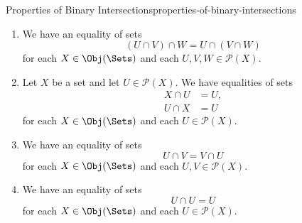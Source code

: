 \begin{proposition}{Properties of Binary Intersections}{properties-of-binary-intersections}
\begin{enumerate}
\begin{enumerate}
                    \begin{enumerate}
                        \item We have $U\cap V\subset W$.
                        \item We have $U\subset\eHom_{\mathcal{P}(X)}(V,W)$.
                        \item We have $U\subset(X\setminus V)\cup W$.
                    \end{enumerate}
                \item The following conditions are equivalent:
                    \begin{enumerate}
                        \item We have $V\cap U\subset W$.
                        \item We have $V\subset\eHom_{\mathcal{P}(X)}(U,W)$.
                        \item We have $V\subset(X\setminus U)\cup W$.
                    \end{enumerate}
            \end{enumerate}
        \item\label{properties-of-binary-intersections-associativity}We have an equality of sets
            \[
                (U\cap V)\cap W%
                =%
                U\cap(V\cap W)%
            \]%
            for each $X\in\Obj(\Sets)$ and each $U,V,W\in\mathcal{P}(X)$.
        \item\label{properties-of-binary-intersections-unitality}Let $X$ be a set and let $U\in\mathcal{P}(X)$. We have equalities of sets
            \begin{align*}
                X\cap U &= U,\\
                U\cap X &= U
            \end{align*}
            for each $X\in\Obj(\Sets)$ and each $U\in\mathcal{P}(X)$.
        \item\label{properties-of-binary-intersections-commutativity}We have an equality of sets
            \[
                U\cap V%
                =
                V\cap U%
            \]%
            for each $X\in\Obj(\Sets)$ and each $U,V\in\mathcal{P}(X)$.
        \item\label{properties-of-binary-intersections-idempotency}We have an equality of sets
            \[%
                U\cap U%
                =%
                U%
            \]%
            for each $X\in\Obj(\Sets)$ and each $U\in\mathcal{P}(X)$.

\end{enumerate}
\end{proposition}
